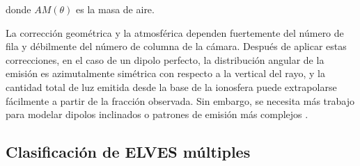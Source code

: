 \documentclass[11pt,oneside,openany,letter]{book}
\begin{document}
donde $AM(\theta)$ es la masa de aire. 

La corrección geométrica y la atmosférica dependen fuertemente del número de fila y débilmente del número de columna de la cámara. Después de aplicar estas correcciones, en el caso de un dipolo perfecto, la distribución angular de la emisión es azimutalmente simétrica con respecto a la vertical del rayo, y la cantidad total de luz emitida desde la base de la ionosfera puede extrapolarse fácilmente a partir de la fracción observada. Sin embargo, se necesita más trabajo para modelar dipolos inclinados o patrones de emisi\'on m\'as complejos \cite{Mussa2019}.


\subsection{Clasificación de ELVES múltiples}
\end{document}

